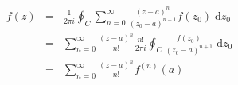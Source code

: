 \documentclass[dvipdfmx]{jsarticle}
\begin{document}
\newcommand*\testmath[3]{%
  \bgroup
  \def\rmdefault{#1}%
  \def\sfdefault{#2}%
  \def\ttdefault{#3}%
  \selectfont \normalfont
  \samplemath
  \egroup
}
\newcommand*\samplemath{%
  \newcommand*\suminfn{\sum^\infty_{n = 0}}%
  \newcommand*\dif{\;\mathrm{d}}%
\begin{eqnarray*}%
 f(z) & = & \frac{1}{2\pi i} \oint_C \suminfn 
            \frac{(z - a)^n}{(z_0 - a)^{n+1}} f(z_0) \dif{z_0} \\
      & = & \suminfn \frac{(z - a)^n}{n!} \frac{n!}{2\pi i}
            \oint_C \frac{f(z_0)}{(z_0 - a)^{n + 1}} \dif{z_0}\\
      & = & \suminfn \frac{(z-a)^n}{n!} f^{(n)}(a)
\end{eqnarray*}%
}
\newcommand*\sampletext{
  \newcommand*\samplepar{%
     `I'm afraid I haven't got one,' Alice said in a frightened tone: `there
     wasn't a ticket-office where I came from.'' And again the chorus of
     voices went on. `There wasn't room for one where she came from. The land
     there is worth a thousand pounds an inch!'}
  {\rmfamily \samplepar}\par
  {\sffamily \samplepar}\par
  {\ttfamily \samplepar}\par
}

\narrowbaselines

\setlength\parindent{0pt}

\testmath{cmr}{cmss}{cmtt}
\end{document}
